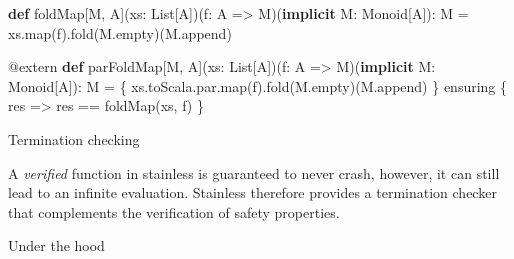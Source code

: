 \documentclass[
  ignorenonframetext,
]{beamer}
\newenvironment{Shaded}{}{}
\newcommand{\FunctionTok}[1]{\textcolor[rgb]{0.02,0.16,0.49}{#1}}
\newcommand{\KeywordTok}[1]{\textcolor[rgb]{0.00,0.44,0.13}{\textbf{#1}}}
\newcommand{\NormalTok}[1]{#1}
\begin{document}
\begin{frame}[fragile]

\begin{Shaded}
\begin{Highlighting}[]
\KeywordTok{def}\NormalTok{ foldMap[M, A](xs: List[A])(f: A => M)(}\KeywordTok{implicit}\NormalTok{ M: Monoid[A]): M =}
\NormalTok{  xs.}\FunctionTok{map}\NormalTok{(f).}\FunctionTok{fold}\NormalTok{(M.}\FunctionTok{empty}\NormalTok{)(M.}\FunctionTok{append}\NormalTok{)}
  
\NormalTok{@extern}
\KeywordTok{def}\NormalTok{ parFoldMap[M, A](xs: List[A])(f: A => M)(}\KeywordTok{implicit}\NormalTok{ M: Monoid[A]): M = \{}
\NormalTok{  xs.}\FunctionTok{toScala}\NormalTok{.}\FunctionTok{par}\NormalTok{.}\FunctionTok{map}\NormalTok{(f).}\FunctionTok{fold}\NormalTok{(M.}\FunctionTok{empty}\NormalTok{)(M.}\FunctionTok{append}\NormalTok{)}
\NormalTok{\} ensuring \{ res =>}
\NormalTok{  res == }\FunctionTok{foldMap}\NormalTok{(xs, f)}
\NormalTok{\}}
\end{Highlighting}
\end{Shaded}

\end{frame}

\begin{frame}{Termination checking}
\protect\hypertarget{termination-checking}{}

A \emph{verified} function in stainless is guaranteed to never crash,
however, it can still lead to an infinite evaluation. Stainless
therefore provides a termination checker that complements the
verification of safety properties.

\end{frame}

\begin{frame}{Under the hood}
\protect\hypertarget{under-the-hood}{}

\end{frame}
\end{document}
